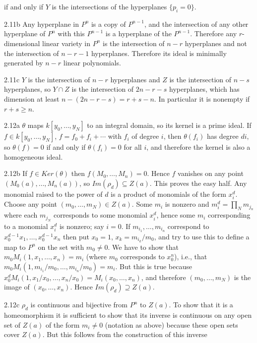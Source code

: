 if and only if $Y$ is the intersections of the hyperplanes $\{p_i=0\}$. 
\item{2.11b} Any hyperplane in $P^n$ is a copy of $P^{n-1}$, and the intersection of any other hyperplane of $P^n$ with this $P^{n-1}$ is a hyperplane of
the $P^{n-1}$. Therefore any $r$-dimensional linear variety in
$P^n$ is the intersection of $n-r$ hyperplanes and not the intersection
of $n-r-1$ hyperplanes. Therefore its ideal is minimally generated
by $n-r$ linear polynomials. 
\item {2.11c} $Y$ is the intersection of $n-r$ hyperplanes and
$Z$ is the intersection of $n-s$ hyperplanes, so $Y\cap Z$ 
is the intersection of $2n-r-s$ hyperplanes, 
which has dimension at least $n-(2n-r-s)=r+s-n$. In particular it 
is nonempty if $r+s\ge n$. 
\item{2.12a} $\theta$ maps $k[y_0,\ldots,y_N]$ to an integral domain,
so its kernel is a prime ideal. If $f\in k[y_0,\ldots,y_N]$,
$f=f_0+f_i+\cdots$ with $f_i $ of degree $i$, then $\theta(f_i)$ has
degree $di$, so $\theta(f)=0$ if and only if $\theta(f_i)=0$ for all
$i$, and therefore the kernel is also a homogeneous ideal.
\item{2.12b} If $f\in Ker(\theta)$ then $f(M_0,\ldots, M_n)=0$. 
Hence $f$ vanishes on any point $(M_0(a),\ldots ,M_n(a))$, so
$Im(\rho_d)\subseteq Z(a)$. This proves the easy half.  Any monomial
raised to the power of $d$ is a product of monomials of the form
$x_i^d$. Choose any point $(m_0,\ldots,m_N)\in Z(a)$. Some $m_i$ is
nonzero and $m_i^d=\prod_Nm_{j_n}$ where each $m_{j_N}$ corresponds to
some monomial $x_i^d$, hence some $m_i$ corresponding to a monomial
$x_i^d$ is nonzero; say $i=0$.  If $m_{i_1},\ldots, m_{i_n}$
correspond to $x_0^{d-1}x_1, \ldots, x_0^{d-1}x_n$ then put $x_0=1$,
$x_k=m_{i_k}/m_0$, and try to use this to define a map to $P^n$ on the
set with $m_0\ne 0$. We have to show that
$m_0M_i(1,x_1,\ldots,x_n)=m_i$ (where $m_0$ corresponds to $x_0^n$),
i.e., that $m_0M_i(1,m_{i_1}/m_0,\ldots,m_{i_n}/m_0)=m_i$. But this is
true because $x_0^dM_i(1,x_1/x_0,\ldots,x_n/x_0)=M_i(x_0,\ldots,
x_n)$, and therefore $(m_0,\ldots, m_N)$ is the image of
$(x_0,\ldots,x_n)$. Hence $Im(\rho_d)\supseteq Z(a)$.
\item {2.12c} $\rho_d$ is continuous and bijective from $P^n$ to $Z(a)$. 
To show that it is a homeomorphism it is sufficient to show that 
its inverse is continuous on any open set of $Z(a) $ of the
form $m_i\ne 0$ (notation as above) because these open sets cover
$Z(a)$. But this follows from the construction of this inverse 
